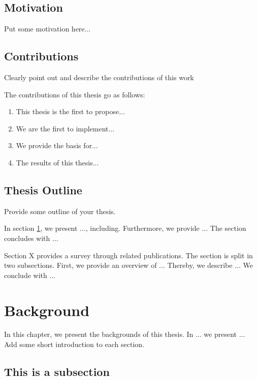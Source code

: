 \subsection{Motivation}
\label{sec:motivation}

Put some motivation here...

\clearpage
\subsection{Contributions}
\label{sec:contributions}

Clearly point out and describe the contributions of this work

The contributions of this thesis go as follows: 
\begin{enumerate}
	\item This thesis is the first to propose...
	\item We are the first to implement...
	\item We provide the basis for...
	\item The results of this thesis...
\end{enumerate}
\clearpage

\subsection{Thesis Outline}

Provide some outline of your thesis.

  In section  \ref{sec:Background}, we present ..., including. Furthermore, we provide ... The section concludes with ...

 Section X provides a survey through related publications. The section is split in two subsections. First, we provide an overview of ... Thereby, we describe ... We conclude with ...

\section{Background}
\label{sec:Background}

In this chapter, we present the backgrounds of this thesis. In ... we present ... Add some short introduction to each section.

\subsection{This is a subsection}
\label{sec:This is a subsection}

